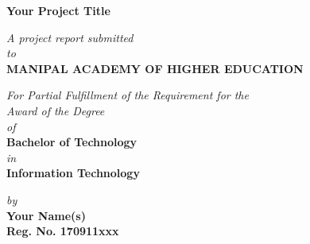 \documentclass[runningheads,a4paper,12pt]{report}
\begin{document}


\begin{titlepage}
	\begin{center}
	\large{\textbf{Your Project Title}}
	\end{center}
	
	\begin{center}
	\small{\textit{A project report submitted} \\ \textit{to} \\\textbf{MANIPAL ACADEMY OF HIGHER EDUCATION} \\}
	\end{center}
	

	\vspace{-0.5cm}
	\begin{center}
	\small{\textit{For Partial Fulfillment of the Requirement for the\\ Award of the Degree\\of}} \\
	\textbf{Bachelor of Technology} \\ \textit{in} \\ \textbf{Information Technology}
	\end{center}
	
	\begin{center}
	\small{\textit{by}} \\
	\textbf{Your Name(s)} \\ \textbf{Reg. No. 170911xxx} \\
	\end{center}


\end{titlepage}
\end{document}
